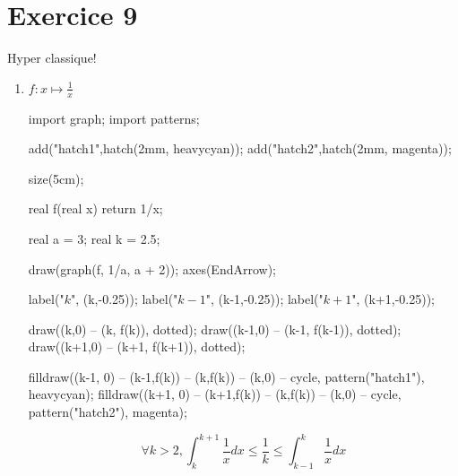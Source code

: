 \part{Exercice 9}

\begin{center}
	\Large Hyper classique!
\end{center}

\begin{enumerate}
	\item $f: x \mapsto \frac{1}{x}$ \\
		\begin{center}
			\begin{asy}
				import graph;
				import patterns;

				add("hatch1",hatch(2mm, heavycyan));
				add("hatch2",hatch(2mm, magenta));

				size(5cm);

				real f(real x) {return 1/x;}

				real a = 3;
				real k = 2.5;

				draw(graph(f, 1/a, a + 2));
				axes(EndArrow);

				label("\small $k$", (k,-0.25));
				label("\small $k-1$", (k-1,-0.25));
				label("\small $k+1$", (k+1,-0.25));

				draw((k,0) -- (k, f(k)), dotted);
				draw((k-1,0) -- (k-1, f(k-1)), dotted);
				draw((k+1,0) -- (k+1, f(k+1)), dotted);

				filldraw((k-1, 0) -- (k-1,f(k)) -- (k,f(k)) -- (k,0) -- cycle, pattern("hatch1"), heavycyan);
				filldraw((k+1, 0) -- (k+1,f(k)) -- (k,f(k)) -- (k,0) -- cycle, pattern("hatch2"), magenta);
			\end{asy}
		\end{center}
		\[
			\forall k > 2,
			\int_{k}^{k+1} \frac{1}{x} dx \le \frac{1}{k} \le \int_{k-1}^{k} \frac{1}{x} dx
		\]


\end{enumerate}
